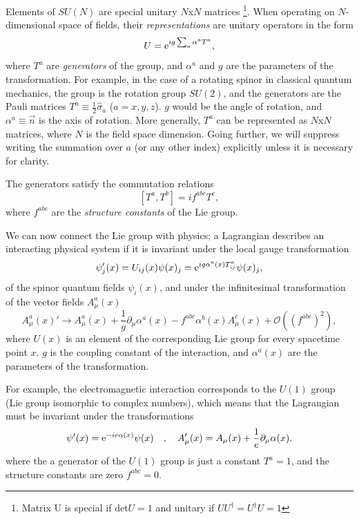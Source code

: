 Elements of $SU(N)$ are special unitary $N$x$N$ matrices \footnote{Matrix U is special if det$U=1$ and unitary if $UU^{\dagger}= U^{\dagger}U = 1$}. 
When operating on $N$-dimensional space of fields, their \emph{representations} are unitary operators in the form 
\begin{equation}
    \label{eq:lie_element}
    U = \mathrm{e}^{i g \sum_{a} \alpha^a T^a},
\end{equation}
where $T^a$ are \emph{generators} of the group, and $\alpha^a$ and $g$  are the parameters of the transformation.
For example, in the case of a rotating spinor in classical quantum mechanics, the group is the rotation group $SU(2)$, and the generators are the Pauli matrices $T^a \equiv \frac12 \hat{\sigma}_a$ ($a = x,y,z$).
$g$ would be the angle of rotation, and $\alpha^a \equiv \vec{n}$ is the axis of rotation.
More generally, $T^a$ can be represented as $N$x$N$ matrices, where $N$ is the field space dimension.
Going further, we will suppress writing the summation over $a$ (or any other index) explicitly unless it is necessary for clarity.

The generators satisfy the commutation relations
\begin{equation}
    \label{eq:commutation}
    [T^a, T^b] = i f^{abc} T^c,
\end{equation}
where $f^{abc}$ are the \emph{structure constants} of the Lie group.

We can now connect the Lie group with physics; a Lagrangian describes an interacting physical system if it is invariant under the local gauge transformation
\begin{equation}
    \label{eq:}
    \psi_j'(x) = U_{ij}(x)\psi(x)_j = \mathrm{e}^{i g \alpha^a(x) T^a_{ij}} \psi(x)_j,
\end{equation}
of the spinor quantum fields $\psi_i(x)$, and under the infinitesimal transformation of the vector fields $A^a_\mu(x)$
\begin{equation}
    \label{eq:gauge_inv_bosons}
    A^a_\mu(x)' \rightarrow A^a_\mu(x) + \frac{1}{g} \partial_\mu \alpha^a(x) - f^{abc} \alpha^b(x) A^c_\mu(x) + \mathcal{O}((f^{abc})^2),
\end{equation}
where $U(x)$ is an element of the corresponding Lie group for every spacetime point $x$.
$g$ is the coupling constant of the interaction, and $\alpha^a(x)$ are the parameters of the transformation.


For example, the electromagnetic interaction corresponds to the $U(1)$ group (Lie group isomorphic to complex numbers), which means that the Lagrangian must be invariant under the transformations
\begin{equation}
    \label{eq:gauge_inv_QED}
    \psi'(x) = \mathrm{e}^{-i e \alpha(x)}\psi(x) \quad, \quad A_\mu'(x) = A_\mu(x) + \frac{1}{e} \partial_\mu \alpha(x).
\end{equation}
where the a generator of the $U(1)$ group is just a constant $T^a = 1$, and the structure constants are zero $f^{abc} = 0$.


